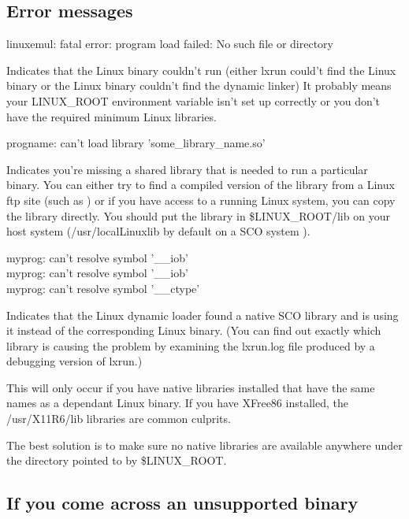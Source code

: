 \documentclass[letterpaper]{article}
\begin{document}
\subsection{Error messages}

{\ttfamily linuxemul: fatal error: program load failed: No such file or directory}

Indicates that the Linux binary couldn't run 
(either lxrun could't find the Linux binary or the Linux binary 
couldn't find the dynamic linker)
It probably means your LINUX\_ROOT environment variable isn't set up 
correctly or you don't have the required minimum Linux libraries.

{\ttfamily progname: can't load library 'some\_library\_name.so'}

Indicates you're missing a shared library that is needed to
run a particular binary.  You can either try to find a
compiled version of the library from a Linux ftp site
(such as ) or if you
have access to a running Linux system, you can copy the
library directly.  You should put the library in
\$LINUX\_ROOT/lib on your host system 
(/usr/localLinuxlib by default on a SCO system ).

{\ttfamily myprog: can't resolve symbol '\_\_iob'\\ 
myprog: can't resolve symbol '\_\_iob'\\ 
myprog: can't resolve symbol '\_\_ctype'}

Indicates that the Linux dynamic loader found a native SCO library
and is using it instead of the corresponding Linux binary.  
(You can find out exactly which library is causing the problem by
examining the lxrun.log file produced by a debugging version of
lxrun.)

This will only occur if you have native libraries
installed that have the same names as a dependant Linux binary.
If you have XFree86 installed, the /usr/X11R6/lib libraries are
common culprits.

The best solution is to make sure no native libraries are
available anywhere under the directory pointed to by
\$LINUX\_ROOT.




\subsection{If you come across an unsupported binary}
\end{document}
